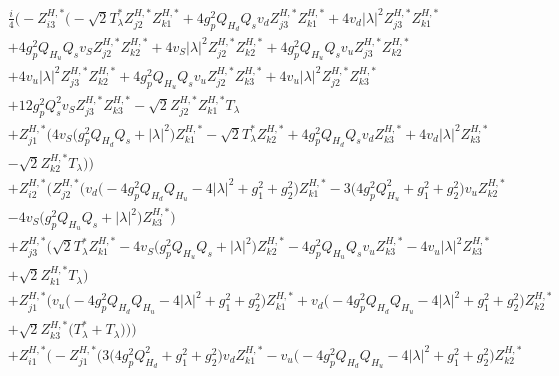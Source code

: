 \begin{align} 
 &\frac{i}{4} \Big(- Z^{H,*}_{i 3} \Big(- \sqrt{2} T_{\lambda}^* Z^{H,*}_{j 2} Z^{H,*}_{k 1} +4 g_{p}^{2} Q_{H_d} Q_s v_d Z^{H,*}_{j 3} Z^{H,*}_{k 1} +4 v_d |\lambda|^2 Z^{H,*}_{j 3} Z^{H,*}_{k 1} \nonumber \\ 
 &+4 g_{p}^{2} Q_{H_u} Q_s v_S Z^{H,*}_{j 2} Z^{H,*}_{k 2} +4 v_S |\lambda|^2 Z^{H,*}_{j 2} Z^{H,*}_{k 2} +4 g_{p}^{2} Q_{H_u} Q_s v_u Z^{H,*}_{j 3} Z^{H,*}_{k 2} \nonumber \\ 
 &+4 v_u |\lambda|^2 Z^{H,*}_{j 3} Z^{H,*}_{k 2} +4 g_{p}^{2} Q_{H_u} Q_s v_u Z^{H,*}_{j 2} Z^{H,*}_{k 3} +4 v_u |\lambda|^2 Z^{H,*}_{j 2} Z^{H,*}_{k 3} \nonumber \\ 
 &+12 g_{p}^{2} Q_{s}^{2} v_S Z^{H,*}_{j 3} Z^{H,*}_{k 3} - \sqrt{2} Z^{H,*}_{j 2} Z^{H,*}_{k 1} T_{\lambda} \nonumber \\ 
 &+Z^{H,*}_{j 1} \Big(4 v_S \Big(g_{p}^{2} Q_{H_d} Q_s  + |\lambda|^2\Big)Z^{H,*}_{k 1} - \sqrt{2} T_{\lambda}^* Z^{H,*}_{k 2} +4 g_{p}^{2} Q_{H_d} Q_s v_d Z^{H,*}_{k 3} +4 v_d |\lambda|^2 Z^{H,*}_{k 3} \nonumber \\ 
 &- \sqrt{2} Z^{H,*}_{k 2} T_{\lambda} \Big)\Big)\nonumber \\ 
 &+Z^{H,*}_{i 2} \Big(Z^{H,*}_{j 2} \Big(v_d \Big(-4 g_{p}^{2} Q_{H_d} Q_{H_u}  -4 |\lambda|^2  + g_{1}^{2} + g_{2}^{2}\Big)Z^{H,*}_{k 1} -3 \Big(4 g_{p}^{2} Q_{H_u}^{2}  + g_{1}^{2} + g_{2}^{2}\Big)v_u Z^{H,*}_{k 2} \nonumber \\ 
 &-4 v_S \Big(g_{p}^{2} Q_{H_u} Q_s  + |\lambda|^2\Big)Z^{H,*}_{k 3} \Big)\nonumber \\ 
 &+Z^{H,*}_{j 3} \Big(\sqrt{2} T_{\lambda}^* Z^{H,*}_{k 1} -4 v_S \Big(g_{p}^{2} Q_{H_u} Q_s  + |\lambda|^2\Big)Z^{H,*}_{k 2} -4 g_{p}^{2} Q_{H_u} Q_s v_u Z^{H,*}_{k 3} -4 v_u |\lambda|^2 Z^{H,*}_{k 3} \nonumber \\ 
 &+\sqrt{2} Z^{H,*}_{k 1} T_{\lambda} \Big)\nonumber \\ 
 &+Z^{H,*}_{j 1} \Big(v_u \Big(-4 g_{p}^{2} Q_{H_d} Q_{H_u}  -4 |\lambda|^2  + g_{1}^{2} + g_{2}^{2}\Big)Z^{H,*}_{k 1} +v_d \Big(-4 g_{p}^{2} Q_{H_d} Q_{H_u}  -4 |\lambda|^2  + g_{1}^{2} + g_{2}^{2}\Big)Z^{H,*}_{k 2} \nonumber \\ 
 &+\sqrt{2} Z^{H,*}_{k 3} \Big(T_{\lambda}^* + T_{\lambda}\Big)\Big)\Big)\nonumber \\ 
 &+Z^{H,*}_{i 1} \Big(- Z^{H,*}_{j 1} \Big(3 \Big(4 g_{p}^{2} Q_{H_d}^{2}  + g_{1}^{2} + g_{2}^{2}\Big)v_d Z^{H,*}_{k 1} - v_u \Big(-4 g_{p}^{2} Q_{H_d} Q_{H_u}  -4 |\lambda|^2  + g_{1}^{2} + g_{2}^{2}\Big)Z^{H,*}_{k 2} \nonumber \\ 

\end{align}
